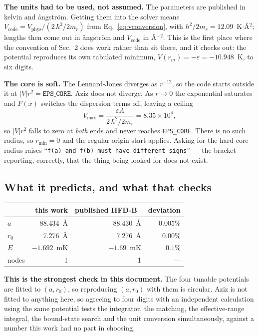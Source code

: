 \documentclass[11pt,a4paper]{article}
\begin{document}
\textbf{The units had to be used, not assumed.} The parameters are published in
kelvin and \aa ngstr\"om. Getting them into the solver means
$V_{\mathrm{code}} = V_{\mathrm{phys}}/(2\,\hbar^2/2m_r)$ from
Eq.~\eqref{eq:vconversion}, with $\hbar^2/2m_r = 12.09$~K$\cdot$\AA$^2$; lengths
then come out in \aa ngstr\"om and $V_{\mathrm{code}}$ in \AA$^{-2}$. This is
the first place where the convention of Sec.~2 does work rather than sit there,
and it checks out: the potential reproduces its own tabulated minimum,
$V(r_m) = -\varepsilon = -10.948$~K, to six digits.

\textbf{The core is soft.} The Lennard-Jones diverges as $r^{-12}$, so the code
starts outside it at $|V|r^2 = \texttt{EPS\_CORE}$. Aziz does not diverge. As
$r\to0$ the exponential saturates and $F(x)$ switches the dispersion terms off,
leaving a ceiling
\[
  V_{\max} = \frac{\varepsilon A}{2\,\hbar^2/2m_r} = 8.35\times10^{4},
\]
so $|V|r^2$ falls to zero at \emph{both} ends and never reaches
\texttt{EPS\_CORE}. There is no such radius, so $r_{\min}=0$ and the
regular-origin start applies.
Asking for the hard-core radius raises ``\texttt{f(a) and f(b) must have
different signs}'' --- the bracket reporting, correctly, that the thing being
looked for does not exist.

\subsection*{What it predicts, and what that checks}

\begin{center}
\begin{tabular}{lrrr}
\toprule
 & this work & published HFD-B~\cite{stipanovic} & deviation \\
\midrule
$a$ & $88.434$~\AA & $88.430$~\AA & $0.005\%$ \\
$r_0$ & $7.276$~\AA & $7.276$~\AA & $0.00\%$ \\
$E$ & $-1.692$~mK & $-1.69$~mK & $0.1\%$ \\
nodes & 1 & 1 & --- \\
\bottomrule
\end{tabular}
\end{center}

\textbf{This is the strongest check in this document.} The four tunable
potentials are fitted to $(a, r_0)$, so reproducing $(a, r_0)$ with them is
circular. Aziz is not fitted to anything here, so agreeing to four digits with
an independent calculation using the same potential tests the integrator, the
matching, the effective-range integral, the bound-state search and the unit
conversion simultaneously, against a number this work had no part in choosing.
\end{document}
